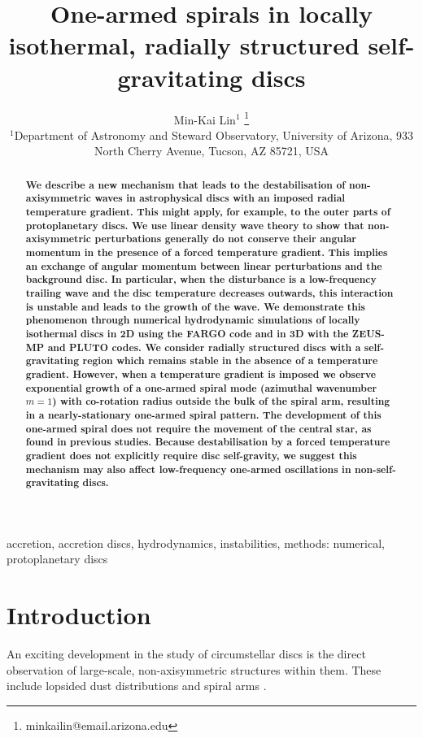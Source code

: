 \documentclass[useAMS,usenatbib]{mn2e}
\title[One-armed spirals]{One-armed spirals in 
  locally isothermal, radially structured self-gravitating discs}
\author[Lin]{Min-Kai Lin$^{1}$
  \thanks{ minkailin@email.arizona.edu} \\ 
  $^1$Department of Astronomy and Steward Observatory, University of
  Arizona, 933 North Cherry Avenue, Tucson, AZ 85721, USA 
}
\begin{document}
\maketitle
\begin{abstract} 
  {\bf We describe a new mechanism that leads to the destabilisation of
 non-axisymmetric waves in astrophysical discs with 
 an imposed radial temperature gradient. This might apply, for
 example, to the outer parts of protoplanetary discs. We use linear
 density wave theory 
 to show that non-axisymmetric perturbations generally do not conserve
 their angular momentum in the presence of a forced temperature
 gradient. This implies an exchange of angular momentum 
 between linear perturbations and the background disc. In particular, 
 when the disturbance is a low-frequency 
 trailing wave and the disc temperature decreases outwards, this 
 interaction is unstable and leads to the growth of the wave.  
 We demonstrate this phenomenon through numerical hydrodynamic
 simulations of locally isothermal discs in 2D using the FARGO
 code and in 3D with  the ZEUS-MP and PLUTO codes.  We consider
 radially structured discs with a self-gravitating region which remains
 stable in the absence of a temperature gradient. However,
 when a temperature gradient is imposed we observe exponential growth of a one-armed  
 spiral mode (azimuthal wavenumber $m=1$) with co-rotation radius 
 outside the bulk of the spiral arm, resulting in a nearly-stationary
 one-armed spiral pattern.  The development of this one-armed 
 spiral does not require the movement of the central star, as found in previous studies. 
 Because destabilisation by a forced temperature gradient does 
 not explicitly require disc self-gravity, we suggest this mechanism may also
 affect low-frequency one-armed oscillations in non-self-gravitating
 discs. 
}
\end{abstract}



\begin{keywords}
  accretion, accretion discs, hydrodynamics, instabilities, methods: numerical, protoplanetary discs 
\end{keywords}

\section{Introduction}\label{intro}
An exciting development in the study of circumstellar 
discs is the direct observation of large-scale, non-axisymmetric
structures within them. These
include lopsided dust distributions 
\citep{marel13,fukagawa13,casassus13,isella13,perez14,follette14} and
spiral arms 
\citep{hashimoto11,muto12,boccaletti14,grady13,christiaens14,avenhaus14}. 
\end{document}
